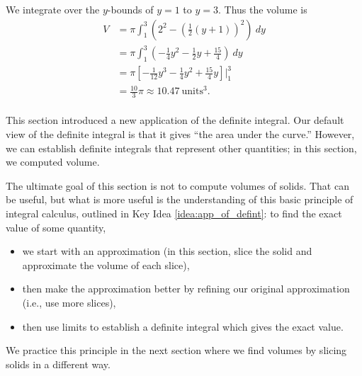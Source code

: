 {We integrate over the $y$-bounds of $y=1$ to $y=3$. Thus the volume is
\begin{align*}
V 	&=	\pi\int_1^3\left(2^2 - \left(\frac12(y+1)\right)^2\right)\ dy \\
		&=	\pi\int_1^3\left(-\frac14y^2-\frac12y+\frac{15}4\right)\ dy \\
		&= 	\pi\left[-\frac1{12}y^3-\frac14y^2+\frac{15}4y\right]\Big|_1^3\\
		&= \frac{10}3\pi \approx 10.47\ \text{units}^3.
\end{align*}
\baselineskip
}\\

This section introduced a new application of the definite integral. Our default view of the definite integral is that it gives ``the area under the curve.'' However, we can establish definite integrals that represent other quantities; in this section, we computed volume.

The ultimate goal of this section is not to compute volumes of solids. That can be useful, but what is more useful is the understanding of this basic principle of integral calculus, outlined in Key Idea \ref{idea:app_of_defint}: to find the exact value of some quantity, \vspace{-0.03 in}
\begin{itemize}
	\item we start with an approximation (in this section, slice the solid and approximate the volume of each slice),\vspace{-0.057 in}
	\item then make the approximation better by refining our original approximation (i.e., use more slices), \vspace{-0.057 in}
	\item	then use limits to establish a definite integral which gives the exact value.%
\end{itemize}

We practice this principle in the next section where we find volumes by slicing solids in a different way.


